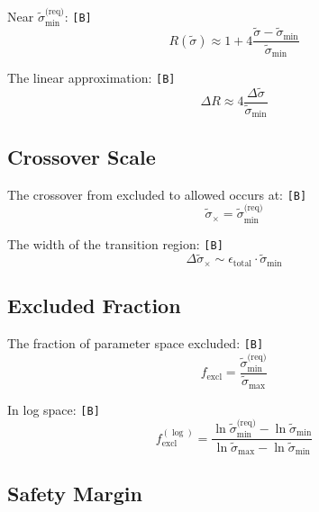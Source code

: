 \documentclass[11pt,a4paper]{article}
\newcommand{\tagB}{\textcolor{purple!70!black}{\texttt{[B]}}}
\theoremstyle{definition}
\begin{document}
Near $\tilde{\sigma}_{\min}^{\text{(req)}}$: \tagB{}
\begin{equation}
\label{eq:asymp-crit-1}
R(\tilde{\sigma}) \approx 1 + 4\frac{\tilde{\sigma} - \tilde{\sigma}_{\min}}{\tilde{\sigma}_{\min}}
\end{equation}

The linear approximation: \tagB{}
\begin{equation}
\label{eq:asymp-crit-2}
\Delta R \approx 4\frac{\Delta\tilde{\sigma}}{\tilde{\sigma}_{\min}}
\end{equation}

\subsection{Crossover Scale}
\label{subsec:crossover}

The crossover from excluded to allowed occurs at: \tagB{}
\begin{equation}
\label{eq:crossover-1}
\tilde{\sigma}_{\times} = \tilde{\sigma}_{\min}^{\text{(req)}}
\end{equation}

The width of the transition region: \tagB{}
\begin{equation}
\label{eq:crossover-2}
\Delta\tilde{\sigma}_{\times} \sim \epsilon_{\text{total}} \cdot \tilde{\sigma}_{\min}
\end{equation}

\subsection{Excluded Fraction}
\label{subsec:excluded-frac}

The fraction of parameter space excluded: \tagB{}
\begin{equation}
\label{eq:excl-frac-1}
f_{\text{excl}} = \frac{\tilde{\sigma}_{\min}^{\text{(req)}}}{\tilde{\sigma}_{\max}}
\end{equation}

In log space: \tagB{}
\begin{equation}
\label{eq:excl-frac-2}
f_{\text{excl}}^{(\log)} = \frac{\ln\tilde{\sigma}_{\min}^{\text{(req)}} - \ln\tilde{\sigma}_{\min}}{\ln\tilde{\sigma}_{\max} - \ln\tilde{\sigma}_{\min}}
\end{equation}

\subsection{Safety Margin}
\label{subsec:safety}
\end{document}
